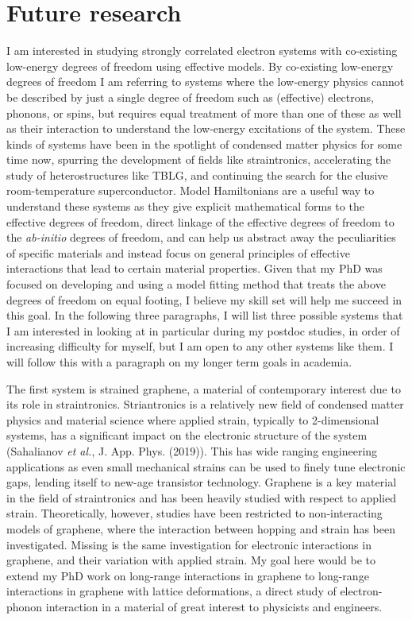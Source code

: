 \documentclass{article}
\begin{document}
\section{Future research}
I am interested in studying strongly correlated electron systems with co-existing low-energy degrees of freedom using effective models.
By co-existing low-energy degrees of freedom I am referring to systems where the low-energy physics cannot be described by just a single degree of freedom such as (effective) electrons, phonons, or spins, but requires equal treatment of more than one of these as well as their interaction to understand the low-energy excitations of the system.
These kinds of systems have been in the spotlight of condensed matter physics for some time now, spurring the development of fields like straintronics, accelerating the study of heterostructures like TBLG, and continuing the search for the elusive room-temperature superconductor.
Model Hamiltonians are a useful way to understand these systems as they give explicit mathematical forms to the effective degrees of freedom, direct linkage of the effective degrees of freedom to the \textit{ab-initio} degrees of freedom, and can help us abstract away the peculiarities of specific materials and instead focus on general principles of effective interactions that lead to certain material properties.
Given that my PhD was focused on developing and using a model fitting method that treats the above degrees of freedom on equal footing, I believe my skill set will help me succeed in this goal.
In the following three paragraphs, I will list three possible systems that I am interested in looking at in particular during my postdoc studies, in order of increasing difficulty for myself, but I am open to any other systems like them.
I will follow this with a paragraph on my longer term goals in academia.

The first system is strained graphene, a material of contemporary interest due to its role in straintronics.
Striantronics is a relatively new field of condensed matter physics and material science where applied strain, typically to 2-dimensional systems, has a significant impact on the electronic structure of the system (Sahalianov \textit{et al.}, J. App. Phys. (2019)).
This has wide ranging engineering applications as even small mechanical strains can be used to finely tune electronic gaps, lending itself to new-age transistor technology.
Graphene is a key material in the field of straintronics and has been heavily studied with respect to applied strain.
Theoretically, however, studies have been restricted to non-interacting models of graphene, where the interaction between hopping and strain has been investigated.
Missing is the same investigation for electronic interactions in graphene,  and their variation with applied strain. 
My goal here would be to extend my PhD work on long-range interactions in graphene to long-range interactions in graphene with lattice deformations, a direct study of electron-phonon interaction in a material of great interest to physicists and engineers.
\end{document}
